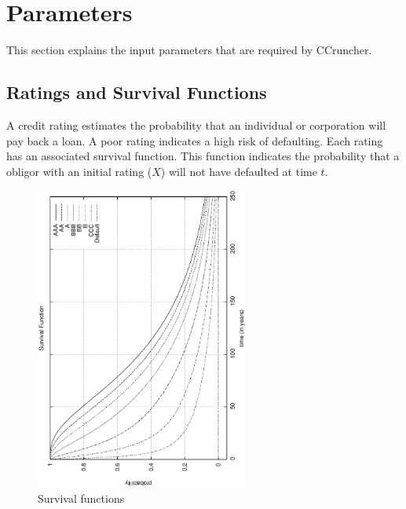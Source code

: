 \documentclass[a4paper,12pt,final]{article}
\begin{document}

\section{Parameters}

This section explains the input parameters that are required by CCruncher.

\subsection{Ratings and Survival Functions}
A credit rating estimates the probability that an individual or corporation 
will pay back a loan. A poor rating indicates a high risk of defaulting.
Each rating has an associated survival function. This function indicates 
the probability that a obligor with an initial rating ($X$) will not have 
defaulted at time $t$. 

\begin{figure}[!hbt]
\begin{center}
\includegraphics[height=10cm, angle=-90]{./images/survival.ps}
\caption{Survival functions}
\label{survival}
\end{center}
\end{figure}
\FloatBarrier
\end{document}
